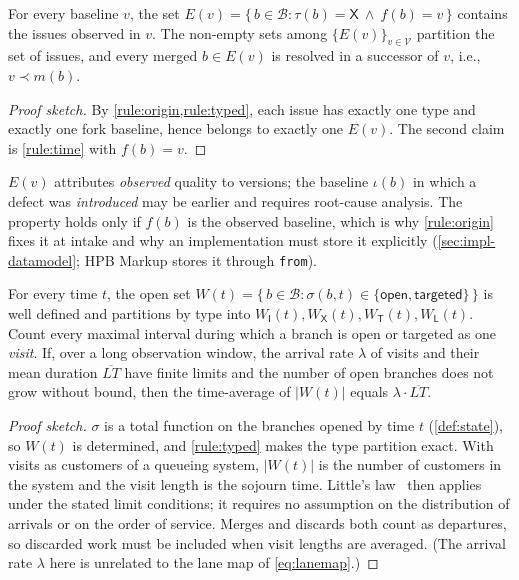 \begin{property}
  \label{prop:escaped}
  For every baseline $v$, the set
  $E(v) = \{\, b \in \mathcal{B} : \tau(b) = \mathsf{X} \ \wedge\ f(b) = v
  \,\}$ contains the issues observed in $v$. The non-empty sets among
  $\{E(v)\}_{v \in \mathcal{V}}$ partition the set of issues, and every
  merged $b \in E(v)$ is resolved in a successor of $v$, i.e.,
  $v \prec m(b)$.
\end{property}
\begin{proof}[Proof sketch]
  By \cref{rule:origin,rule:typed}, each issue has exactly one type and
  exactly one fork baseline, hence belongs to exactly one $E(v)$. The
  second claim is \cref{rule:time} with $f(b) = v$.
\end{proof}
\noindent $E(v)$ attributes \emph{observed} quality to versions; the
baseline $\iota(b)$ in which a defect was \emph{introduced} may be earlier
and requires root-cause analysis. The property holds only if $f(b)$ is the
observed baseline, which is why \cref{rule:origin} fixes it at intake and
why an implementation must store it explicitly (\cref{sec:impl-datamodel};
HPB Markup stores it through \texttt{from}).

\begin{property}
  \label{prop:wip}
  For every time $t$, the open set
  $W(t) = \{\, b \in \mathcal{B} : \sigma(b,t) \in \{\textsf{open},
  \textsf{targeted}\} \,\}$ is well defined and partitions by type into
  $W_{\mathsf{I}}(t), W_{\mathsf{X}}(t), W_{\mathsf{T}}(t),
  W_{\mathsf{L}}(t)$. Count every maximal interval during which a branch is
  open or targeted as one \emph{visit}. If, over a long observation window,
  the arrival rate $\lambda$ of visits and their mean duration
  $\overline{LT}$ have finite limits and the number of open branches does
  not grow without bound, then the time-average of $|W(t)|$ equals
  $\lambda \cdot \overline{LT}$.
\end{property}
\begin{proof}[Proof sketch]
  $\sigma$ is a total function on the branches opened by time $t$
  (\cref{def:state}), so $W(t)$ is determined, and \cref{rule:typed} makes
  the type partition exact. With visits as customers of a queueing system,
  $|W(t)|$ is the number of customers in the system and the visit length is
  the sojourn time. Little's law~\citep{little1961} then applies under the
  stated limit conditions; it requires no assumption on the distribution of
  arrivals or on the order of service. Merges and discards both count as
  departures, so discarded work must be included when visit lengths are
  averaged. (The arrival rate $\lambda$ here is unrelated to the lane map
  of \cref{eq:lanemap}.)
\end{proof}

